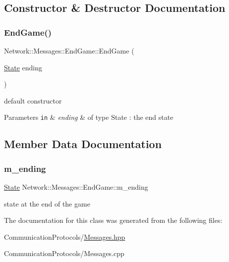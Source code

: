 \subsection{Constructor \& Destructor Documentation}
\mbox{\label{class_network_1_1_messages_1_1_end_game_a4ead99b7003dc21bc16a16a8451b0f24}} 
\subsubsection{\texorpdfstring{End\+Game()}{EndGame()}}
{\footnotesize\ttfamily Network\+::\+Messages\+::\+End\+Game\+::\+End\+Game (\begin{DoxyParamCaption}\item[{\hyperlink{class_network_1_1_messages_1_1_end_game_ae84fe527cbd90a7ba464dbcd48f0e941}{State}}]{ending }\end{DoxyParamCaption})\hspace{0.3cm}{\ttfamily [inline]}}



default constructor 


\begin{DoxyParams}[1]{Parameters}
\mbox{\tt in}  & {\em ending} & of type State \+: the end state \\
\hline
\end{DoxyParams}


\subsection{Member Data Documentation}
\mbox{\label{class_network_1_1_messages_1_1_end_game_a28d92c273181cd08ecc01360c23afa18}} 
\subsubsection{\texorpdfstring{m\+\_\+ending}{m\_ending}}
{\footnotesize\ttfamily \hyperlink{class_network_1_1_messages_1_1_end_game_ae84fe527cbd90a7ba464dbcd48f0e941}{State} Network\+::\+Messages\+::\+End\+Game\+::m\+\_\+ending}

state at the end of the game 

The documentation for this class was generated from the following files\+:\begin{DoxyCompactItemize}
\item 
Communication\+Protocols/\hyperlink{_messages_8hpp}{Messages.\+hpp}\item 
Communication\+Protocols/Messages.\+cpp\end{DoxyCompactItemize}
